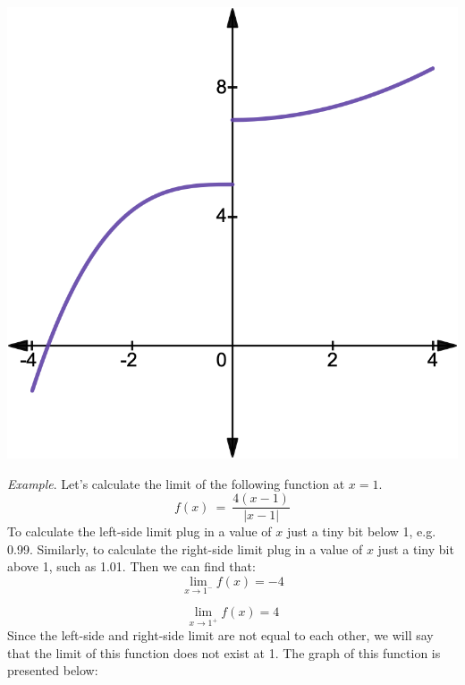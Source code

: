 \documentclass{./../Latex/handout}
\begin{document}
\begin{center}
\includegraphics[scale=0.25]{input/lim1.png}	
\end{center}

\textit{Example}.  Let's calculate the limit of the following function at $x=1$.
$$f(x)\ =\ \frac{4(x-1)}{\left|x-1\right|} $$
To calculate the left-side limit plug in a value of $x$ just a tiny bit below 1, e.g. 0.99. Similarly, to calculate the right-side limit plug in a value of $x$ just a tiny bit above 1, such as 1.01. Then we can find that:
$$\lim_{x \rightarrow 1^-} f(x) = -4$$

$$\lim_{x \rightarrow 1^+} f(x) = 4$$ 
Since the left-side and right-side limit are not equal to each other, we will say that the limit of this function does not exist at 1. The graph of this function is presented below:
\end{document}

